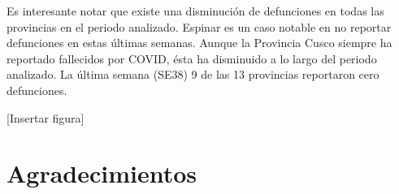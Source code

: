\documentclass[12pt,a4paper,openany]{book}
\begin{document}
	Es interesante notar que existe una disminución de defunciones en todas las provincias en el periodo analizado. Espinar es un caso notable en no reportar defunciones en estas últimas semanas. Aunque la Provincia Cusco siempre ha reportado fallecidos por COVID, ésta ha disminuido a lo largo del periodo analizado. La última semana (SE38) 9 de las 13 provincias reportaron cero defunciones.
	
	[Insertar figura]
	
	
	\chapter*{Agradecimientos}
	
\end{document}
